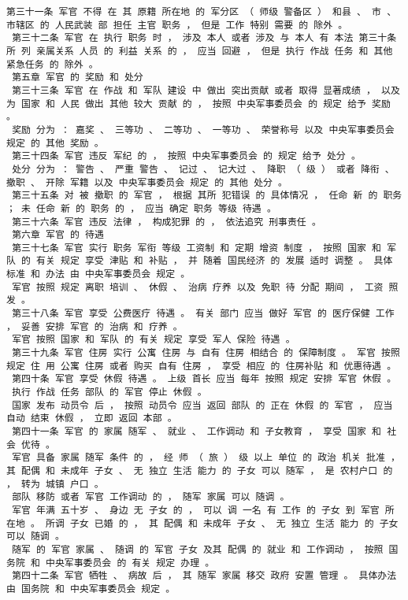 \documentclass{article}
\begin{document}
\begin{Verbatim}[commandchars=\\\{\}]
 第三十一条 军官 不得 在 其 原籍 所在地 的 军分区 （ 师级 警备区 ） 和县 、 市 、 市辖区 的 人民武装 部 担任 主官 职务 ， 但是 工作 特别 需要 的 除外 。 
 第三十二条 军官 在 执行 职务 时 ， 涉及 本人 或者 涉及 与 本人 有 本法 第三十条 所 列 亲属关系 人员 的 利益 关系 的 ， 应当 回避 ， 但是 执行 作战 任务 和 其他 紧急任务 的 除外 。 
 第五章 军官 的 奖励 和 处分 
 第三十三条 军官 在 作战 和 军队 建设 中 做出 突出贡献 或者 取得 显著成绩 ， 以及 为 国家 和 人民 做出 其他 较大 贡献 的 ， 按照 中央军事委员会 的 规定 给予 奖励 。 
 奖励 分为 ： 嘉奖 、 三等功 、 二等功 、 一等功 、 荣誉称号 以及 中央军事委员会 规定 的 其他 奖励 。 
 第三十四条 军官 违反 军纪 的 ， 按照 中央军事委员会 的 规定 给予 处分 。 
 处分 分为 ： 警告 、 严重 警告 、 记过 、 记大过 、 降职 （ 级 ） 或者 降衔 、 撤职 、 开除 军籍 以及 中央军事委员会 规定 的 其他 处分 。 
 第三十五条 对 被 撤职 的 军官 ， 根据 其所 犯错误 的 具体情况 ， 任命 新 的 职务 ； 未 任命 新 的 职务 的 ， 应当 确定 职务 等级 待遇 。 
 第三十六条 军官 违反 法律 ， 构成犯罪 的 ， 依法追究 刑事责任 。 
 第六章 军官 的 待遇 
 第三十七条 军官 实行 职务 军衔 等级 工资制 和 定期 增资 制度 ， 按照 国家 和 军队 的 有关 规定 享受 津贴 和 补贴 ， 并 随着 国民经济 的 发展 适时 调整 。 具体 标准 和 办法 由 中央军事委员会 规定 。 
 军官 按照 规定 离职 培训 、 休假 、 治病 疗养 以及 免职 待 分配 期间 ， 工资 照发 。 
 第三十八条 军官 享受 公费医疗 待遇 。 有关 部门 应当 做好 军官 的 医疗保健 工作 ， 妥善 安排 军官 的 治病 和 疗养 。 
 军官 按照 国家 和 军队 的 有关 规定 享受 军人 保险 待遇 。 
 第三十九条 军官 住房 实行 公寓 住房 与 自有 住房 相结合 的 保障制度 。 军官 按照 规定 住 用 公寓 住房 或者 购买 自有 住房 ， 享受 相应 的 住房补贴 和 优惠待遇 。 
 第四十条 军官 享受 休假 待遇 。 上级 首长 应当 每年 按照 规定 安排 军官 休假 。 
 执行 作战 任务 部队 的 军官 停止 休假 。 
 国家 发布 动员令 后 ， 按照 动员令 应当 返回 部队 的 正在 休假 的 军官 ， 应当 自动 结束 休假 ， 立即 返回 本部 。 
 第四十一条 军官 的 家属 随军 、 就业 、 工作调动 和 子女教育 ， 享受 国家 和 社会 优待 。 
 军官 具备 家属 随军 条件 的 ， 经 师 （ 旅 ） 级 以上 单位 的 政治 机关 批准 ， 其 配偶 和 未成年 子女 、 无 独立 生活 能力 的 子女 可以 随军 ， 是 农村户口 的 ， 转为 城镇 户口 。 
 部队 移防 或者 军官 工作调动 的 ， 随军 家属 可以 随调 。 
 军官 年满 五十岁 、 身边 无 子女 的 ， 可以 调 一名 有 工作 的 子女 到 军官 所在地 。 所调 子女 已婚 的 ， 其 配偶 和 未成年 子女 、 无 独立 生活 能力 的 子女 可以 随调 。 
 随军 的 军官 家属 、 随调 的 军官 子女 及其 配偶 的 就业 和 工作调动 ， 按照 国务院 和 中央军事委员会 的 有关 规定 办理 。 
 第四十二条 军官 牺牲 、 病故 后 ， 其 随军 家属 移交 政府 安置 管理 。 具体办法 由 国务院 和 中央军事委员会 规定 。 

\end{Verbatim}
\end{document}
